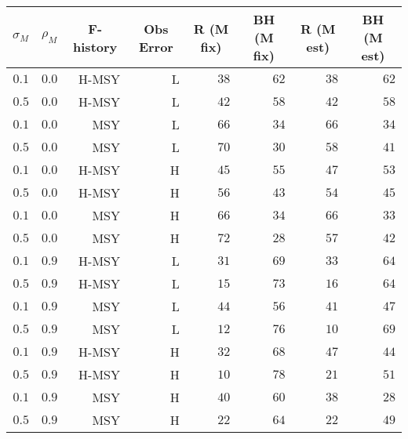 \begin{center}
\begin{tabular}{rrrrrrrr}
\hline\hline
\multicolumn{1}{c}{$\sigma_M$}&\multicolumn{1}{c}{$\rho_M$}&\multicolumn{1}{c}{F-history}&\multicolumn{1}{c}{Obs Error}&\multicolumn{1}{c}{R (M fix)}&\multicolumn{1}{c}{BH (M fix)}&\multicolumn{1}{c}{R (M est)}&\multicolumn{1}{c}{BH (M est)}\tabularnewline
\hline
$0.1$&$0.0$&H-MSY&L&$38$&$62$&$38$&$62$\tabularnewline
$0.5$&$0.0$&H-MSY&L&$42$&$58$&$42$&$58$\tabularnewline
$0.1$&$0.0$&MSY&L&$66$&$34$&$66$&$34$\tabularnewline
$0.5$&$0.0$&MSY&L&$70$&$30$&$58$&$41$\tabularnewline
$0.1$&$0.0$&H-MSY&H&$45$&$55$&$47$&$53$\tabularnewline
$0.5$&$0.0$&H-MSY&H&$56$&$43$&$54$&$45$\tabularnewline
$0.1$&$0.0$&MSY&H&$66$&$34$&$66$&$33$\tabularnewline
$0.5$&$0.0$&MSY&H&$72$&$28$&$57$&$42$\tabularnewline
$0.1$&$0.9$&H-MSY&L&$31$&$69$&$33$&$64$\tabularnewline
$0.5$&$0.9$&H-MSY&L&$15$&$73$&$16$&$64$\tabularnewline
$0.1$&$0.9$&MSY&L&$44$&$56$&$41$&$47$\tabularnewline
$0.5$&$0.9$&MSY&L&$12$&$76$&$10$&$69$\tabularnewline
$0.1$&$0.9$&H-MSY&H&$32$&$68$&$47$&$44$\tabularnewline
$0.5$&$0.9$&H-MSY&H&$10$&$78$&$21$&$51$\tabularnewline
$0.1$&$0.9$&MSY&H&$40$&$60$&$38$&$28$\tabularnewline
$0.5$&$0.9$&MSY&H&$22$&$64$&$22$&$49$\tabularnewline
\hline
\end{tabular}\end{center}
